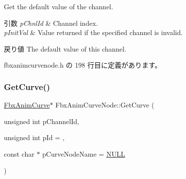 Get the default value of the channel. 
\begin{DoxyParams}{引数}
{\em p\+Chnl\+Id} & Channel index. \\
\hline
{\em p\+Init\+Val} & Value returned if the specified channel is invalid. \\
\hline
\end{DoxyParams}
\begin{DoxyReturn}{戻り値}
The default value of this channel. 
\end{DoxyReturn}


 fbxanimcurvenode.\+h の 198 行目に定義があります。

\mbox{\label{class_fbx_anim_curve_node_a818b6198c31818e863d3d5bc7948c2e2}} 
\subsubsection{\texorpdfstring{Get\+Curve()}{GetCurve()}}
{\footnotesize\ttfamily \hyperlink{class_fbx_anim_curve}{Fbx\+Anim\+Curve}$\ast$ Fbx\+Anim\+Curve\+Node\+::\+Get\+Curve (\begin{DoxyParamCaption}\item[{unsigned int}]{p\+Channel\+Id,  }\item[{unsigned int}]{p\+Id = {},  }\item[{const char $\ast$}]{p\+Curve\+Node\+Name = {\ttfamily \hyperlink{fbxarch_8h_a070d2ce7b6bb7e5c05602aa8c308d0c4}{N\+U\+LL}} }\end{DoxyParamCaption})}

